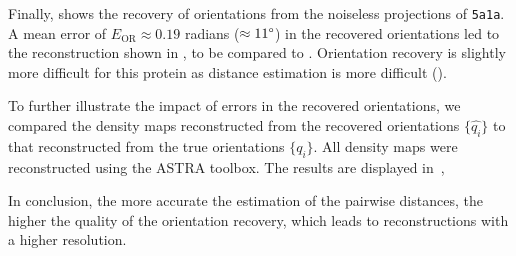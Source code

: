 Finally,  shows the recovery of orientations from the noiseless projections of \texttt{5a1a}.
A mean error of $E_\text{OR} \approx 0.19$ radians ($\approx 11\degree$) in the recovered orientations led to the reconstruction shown in , to be compared to .
Orientation recovery is slightly more difficult for this protein as distance estimation is more difficult ().

To further illustrate the impact of errors in the recovered orientations, we compared the density maps reconstructed from the recovered orientations $\{ \widehat{q_i} \}$ to that reconstructed from the true orientations $\{ q_i \}$. All density maps were reconstructed using the ASTRA toolbox. The results are displayed in~, 

In conclusion, the more accurate the estimation of the pairwise distances, the higher the quality of the orientation recovery, which leads to reconstructions with a higher resolution. %

